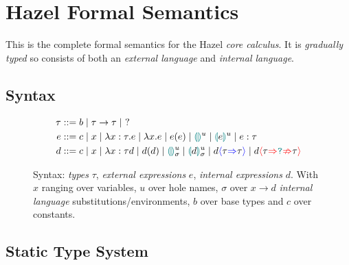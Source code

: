 \chapter{Hazel Formal Semantics}
\label{sec:HazelSemantics}
This is the complete formal semantics for the Hazel \textit{core calculus}. It is \textit{gradually typed} so consists of both an \textit{external language} and \textit{internal language}.

\section{Syntax}
\begin{figure}[h]
\begin{align*}
\tau &::= b \mid \tau \to \tau \mid\  ?\\
e &::= c \mid x \mid \lambda x : \tau.e \mid \lambda x. e \mid e(e) \mid \hole^u \mid \hole[e]^u \mid e : \tau\\
d &::= c \mid x \mid \lambda x : \tau d \mid d(d) \mid \hole^u_\sigma \mid \hole[d]^u_\sigma \mid d\scast{\tau}{\tau} \mid d\scasterror{\tau}{\tau}
\end{align*}
\caption{Syntax: \textit{types} $\tau$, \textit{external expressions} $e$, \textit{internal expressions} $d$. With $x$ ranging over variables, $u$ over hole names, $\sigma$ over $x \to d$ \textit{internal language} substitutions/environments, $b$ over base types and $c$ over constants.}
\label{fig:syntaxappendix}
\end{figure}

\section{Static Type System}
